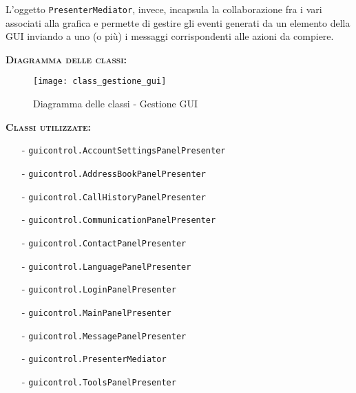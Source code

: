 \begin{description}
L'oggetto \texttt{PresenterMediator}, invece, incapsula la collaborazione fra i vari  associati alla grafica e permette di gestire gli eventi generati da un elemento della GUI inviando a uno (o più)  i messaggi corrispondenti alle azioni da compiere.

	\item{\scshape\bfseries Diagramma delle classi:}\\
  \begin{figure}[H]
    \centering
    \texttt{[image: class\_gestione\_gui]}
    \caption{Diagramma delle classi - Gestione GUI}\label{fig:gestionegui}
  \end{figure}

	\item{\scshape\bfseries Classi utilizzate:}\\
	\begin{itemize}[noitemsep,nolistsep]
	  \item[-] \texttt{guicontrol.AccountSettingsPanelPresenter}
	  \item[-] \texttt{guicontrol.AddressBookPanelPresenter}
	  \item[-] \texttt{guicontrol.CallHistoryPanelPresenter}
	  \item[-] \texttt{guicontrol.CommunicationPanelPresenter}
	  \item[-] \texttt{guicontrol.ContactPanelPresenter}
	  \item[-] \texttt{guicontrol.LanguagePanelPresenter}
	  \item[-] \texttt{guicontrol.LoginPanelPresenter}
	  \item[-] \texttt{guicontrol.MainPanelPresenter}
		\item[-] \texttt{guicontrol.MessagePanelPresenter}
		\item[-] \texttt{guicontrol.PresenterMediator}
	  \item[-] \texttt{guicontrol.ToolsPanelPresenter}
	\end{itemize}
\end{description}


